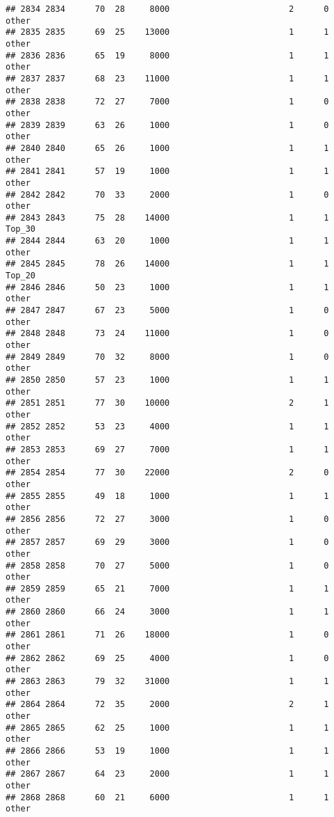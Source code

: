 \documentclass[
]{article}
\begin{document}
\begin{verbatim}
## 2834 2834      70  28     8000                        2      0    other
## 2835 2835      69  25    13000                        1      1    other
## 2836 2836      65  19     8000                        1      1    other
## 2837 2837      68  23    11000                        1      1    other
## 2838 2838      72  27     7000                        1      0    other
## 2839 2839      63  26     1000                        1      0    other
## 2840 2840      65  26     1000                        1      1    other
## 2841 2841      57  19     1000                        1      1    other
## 2842 2842      70  33     2000                        1      0    other
## 2843 2843      75  28    14000                        1      1   Top_30
## 2844 2844      63  20     1000                        1      1    other
## 2845 2845      78  26    14000                        1      1   Top_20
## 2846 2846      50  23     1000                        1      1    other
## 2847 2847      67  23     5000                        1      0    other
## 2848 2848      73  24    11000                        1      0    other
## 2849 2849      70  32     8000                        1      0    other
## 2850 2850      57  23     1000                        1      1    other
## 2851 2851      77  30    10000                        2      1    other
## 2852 2852      53  23     4000                        1      1    other
## 2853 2853      69  27     7000                        1      1    other
## 2854 2854      77  30    22000                        2      0    other
## 2855 2855      49  18     1000                        1      1    other
## 2856 2856      72  27     3000                        1      0    other
## 2857 2857      69  29     3000                        1      0    other
## 2858 2858      70  27     5000                        1      0    other
## 2859 2859      65  21     7000                        1      1    other
## 2860 2860      66  24     3000                        1      1    other
## 2861 2861      71  26    18000                        1      0    other
## 2862 2862      69  25     4000                        1      0    other
## 2863 2863      79  32    31000                        1      1    other
## 2864 2864      72  35     2000                        2      1    other
## 2865 2865      62  25     1000                        1      1    other
## 2866 2866      53  19     1000                        1      1    other
## 2867 2867      64  23     2000                        1      1    other
## 2868 2868      60  21     6000                        1      1    other

\end{verbatim}
\end{document}
